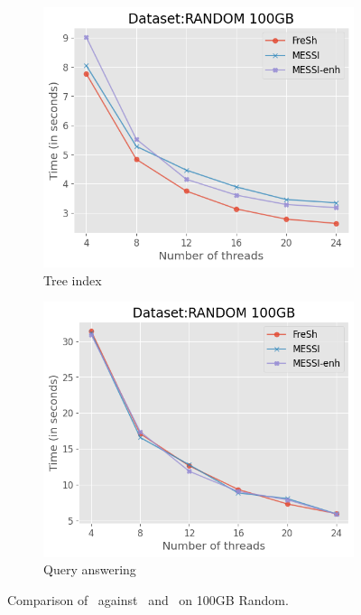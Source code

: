 \begin{figure}[htbp]
    \vspace{0.2cm} %

    \begin{subfigure}{0.48\textwidth}
        \includegraphics[width=\textwidth]{figures/Experiments/fresh-messi-threads-random-tree}
        \caption{Tree index}
        \label{fig:eval:fresh-messi-threads:random:tree-from-4}
    \end{subfigure}    
    \begin{subfigure}{0.48\textwidth}
        \includegraphics[width=\textwidth]{figures/Experiments/fresh-messi-threads-random-query}
        \caption{Query answering}
        \label{fig:eval:fresh-messi-threads:random:queries-from-4}
    \end{subfigure}                

    \caption{Comparison of \Fresh\ against \MESSI\ and \MESSIenh\ on 100GB Random.}
    \label{fig:eval:fresh-messi-threads:random}
\end{figure}

